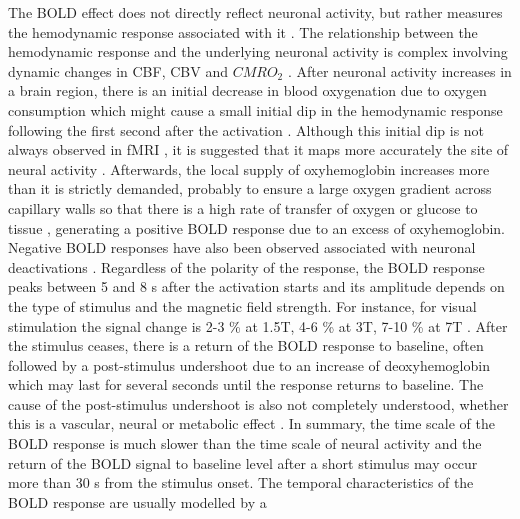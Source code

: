 The BOLD effect does not directly reflect neuronal activity, but rather measures
the hemodynamic response associated with it
\citep{Logothetis2008Whatwecan,Logothetis2001Neurophysiologicalinvestigationbasis}.
The relationship between the hemodynamic response and the underlying neuronal
activity is complex involving dynamic changes in CBF, CBV and $CMRO_2$
\citep{Buxton2009IntroductionFunctionalMagnetic}. After neuronal activity
increases in a brain region, there is an initial decrease in blood oxygenation
due to oxygen consumption which might cause a small initial dip in the
hemodynamic response following the first second after the activation
\citep{Ernst1994Observationfastresponse,Menon1995BOLDBasedFunctional}. Although
this initial dip is not always observed in fMRI
\citep{Behzadi2006Caffeinereducesinitial,Buxton2009IntroductionFunctionalMagnetic,Hu1997Evaluationearlyresponse,Hu1997Evaluationearlyresponse},
it is suggested that it maps more accurately the site of neural activity
\citep{Duong2000SpatiotemporaldynamicsBOLD,Malonek1996InteractionsElectricalActivity}.
Afterwards, the local supply of oxyhemoglobin increases more than it is strictly
demanded, probably to ensure a large oxygen gradient across capillary walls so
that there is a high rate of transfer of oxygen or glucose to tissue
\citep{Logothetis2008Whatwecan}, generating a positive BOLD response due to an
excess of oxyhemoglobin. Negative BOLD responses have also been observed
associated with neuronal deactivations \citep{Shmuel2006NegativefunctionalMRI}.
Regardless of the polarity of the response, the BOLD response peaks between 5
and 8 s after the activation starts and its amplitude depends on the type of
stimulus and the magnetic field strength. For instance, for visual stimulation
the signal change is 2-3 \% at 1.5T, 4-6 \% at 3T, 7-10 \% at 7T
\citep{Zwaag2009fMRI1.53}. After the stimulus ceases, there is a return of the
BOLD response to baseline, often followed by a post-stimulus undershoot due to
an increase of deoxyhemoglobin which may last for several seconds until the
response returns to baseline. The cause of the post-stimulus undershoot is also
not completely understood, whether this is a vascular, neural or metabolic
effect \citep{Buxton2009IntroductionFunctionalMagnetic,Chen2009OriginsBOLDpost}.
In summary, the time scale of the BOLD response is much slower than the time
scale of neural activity and the return of the BOLD signal to baseline level
after a short stimulus may occur more than 30 s from the stimulus onset. The
temporal characteristics of the BOLD response are usually modelled by a
